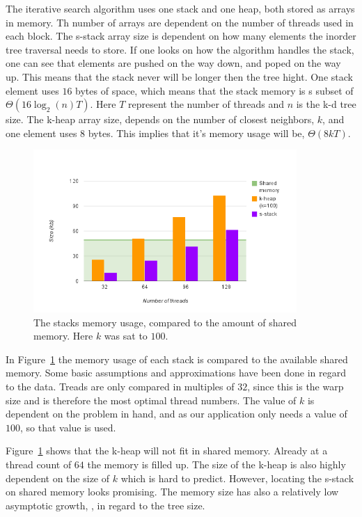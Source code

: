The iterative search algorithm uses one stack and one heap, both stored as arrays in memory. Th number of arrays are dependent on the number of threads used in each block. The s-stack array size is dependent on how many elements the inorder tree traversal needs to store. If one looks on how the algorithm handles the stack, one can see that elements are pushed on the way down, and poped on the way up. This means that the stack never will be longer then the tree hight. One stack element uses $16$ bytes of space, which means that the stack memory is s subset of $\Theta(16\log_2(n)T)$. Here $T$ represent the number of threads and $n$ is the k-d tree size. The k-heap array size, depends on the number of closest neighbors, $k$, and one element uses $8$ bytes. This implies that it's memory usage will be, $\Theta(8kT)$.

\begin{figure}[ht!]
\centering
\includegraphics[width=100mm]{../gfx/shared_memory_and_stack.png}

\caption{The stacks memory usage, compared to the amount of shared memory. Here $k$ was sat to $100$.}
\label{fig:stacks_and_shared_memory}
\end{figure}

In Figure~\ref{fig:stacks_and_shared_memory} the memory usage of each stack is compared to the available shared memory. Some basic assumptions and approximations have been done in regard to the data. Treads are only compared in multiples of $32$, since this is the warp size and is therefore the most optimal thread numbers. The value of $k$ is dependent on the problem in hand, and as our application only needs a value of $100$, so that value is used. 

Figure~\ref{fig:stacks_and_shared_memory} shows that the k-heap will not fit in shared memory. Already at a thread count of $64$ the memory is filled up. The size of the k-heap is also highly dependent on the size of $k$ which is hard to predict. However, locating the s-stack on shared memory looks promising. The memory size has also a relatively low asymptotic growth, , in regard to the tree size.

